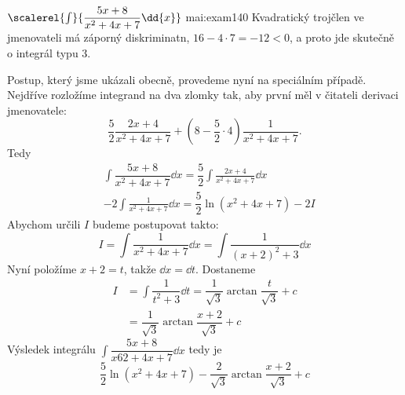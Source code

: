 \begin{mathexam}{\(\protect\scalerel{\int}{\dfrac{5x+8}{x^2+4x+7}\dd{x}}\)
  \hfill\cite[s.~73]{Knichal}}{mai:exam140} 
  Kvadratický trojčlen ve jmenovateli má záporný diskriminatn, \(16-4\cdot7 = -12<0\), a proto jde
  skutečně o integrál typu 3.
  
  Postup, který jsme ukázali obecně, provedeme nyní na speciálním případě. Nejdříve rozložíme
  integrand na dva zlomky tak, aby první měl v čitateli derivaci jmenovatele: 
  \begin{equation*}
    \frac{5}{2}\frac{2x+4}{x^2+4x+7} + \left(8-\frac{5}{2}\cdot4\right)\frac{1}{x^2+4x+7}.
  \end{equation*}
  Tedy
  \begin{align*}
    & \int\dfrac{5x+8}{x^2+4x+7}\dd{x}  = \dfrac{5}{2}\int\frac{2x+4}{x^2+4x+7}\dd{x}  \\
    &-2\int\frac{1}{x^2+4x+7}\dd{x}     = \dfrac{5}{2}\ln(x^2+4x+7) - 2I
  \end{align*}
  Abychom určili \(I\) budeme postupovat takto:
  \begin{equation*}
    I = \int\dfrac{1}{x^2+4x+7}\dd{x} = \int\dfrac{1}{(x+2)^2+3}\dd{x} 
  \end{equation*}
  Nyní položíme \(x+2=t\), takže \(\dd{x}= \dd{t}\). Dostaneme
  \begin{align*}
    I &= \int\dfrac{1}{t^2+3}\dd{t} = \dfrac{1}{\sqrt{3}}\arctan\dfrac{t}{\sqrt{3}} + c \\
      &= \dfrac{1}{\sqrt{3}}\arctan\dfrac{x+2}{\sqrt{3}} + c
  \end{align*}
  Výsledek integrálu \(\int\dfrac{5x+8}{x62+4x+7}\dd{x}\) tedy je 
  \begin{equation*}
    \dfrac{5}{2}\ln(x^2+4x+7) - \dfrac{2}{\sqrt{3}}\arctan\dfrac{x+2}{\sqrt{3}} + c
  \end{equation*}
\end{mathexam}